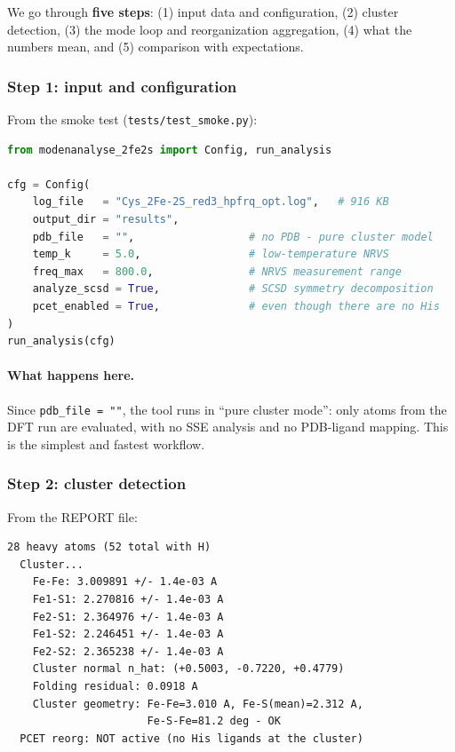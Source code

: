 \documentclass[11pt,a4paper,twoside]{article}
\theoremstyle{remark}
\begin{document}
We go through \textbf{five steps}: (1) input data and
configuration, (2) cluster detection, (3) the mode loop and
reorganization aggregation, (4) what the numbers mean, and
(5) comparison with expectations.

\subsubsection*{Step 1: input and configuration}

From the smoke test (\texttt{tests/test\_smoke.py}):

\begin{lstlisting}[language=Python,basicstyle=\ttfamily\small]
from modenanalyse_2fe2s import Config, run_analysis

cfg = Config(
    log_file   = "Cys_2Fe-2S_red3_hpfrq_opt.log",   # 916 KB
    output_dir = "results",
    pdb_file   = "",                  # no PDB - pure cluster model
    temp_k     = 5.0,                 # low-temperature NRVS
    freq_max   = 800.0,               # NRVS measurement range
    analyze_scsd = True,              # SCSD symmetry decomposition
    pcet_enabled = True,              # even though there are no His
)
run_analysis(cfg)
\end{lstlisting}

\paragraph{What happens here.}
Since \texttt{pdb\_file = ""}, the tool runs in ``pure cluster
mode'': only atoms from the DFT run are evaluated, with no SSE
analysis and no PDB-ligand mapping. This is the simplest and
fastest workflow.

\subsubsection*{Step 2: cluster detection}

From the REPORT file:
\begin{lstlisting}[basicstyle=\ttfamily\small]
  28 heavy atoms (52 total with H)
  Cluster...
    Fe-Fe: 3.009891 +/- 1.4e-03 A
    Fe1-S1: 2.270816 +/- 1.4e-03 A
    Fe2-S1: 2.364976 +/- 1.4e-03 A
    Fe1-S2: 2.246451 +/- 1.4e-03 A
    Fe2-S2: 2.365238 +/- 1.4e-03 A
    Cluster normal n_hat: (+0.5003, -0.7220, +0.4779)
    Folding residual: 0.0918 A
    Cluster geometry: Fe-Fe=3.010 A, Fe-S(mean)=2.312 A,
                      Fe-S-Fe=81.2 deg - OK
  PCET reorg: NOT active (no His ligands at the cluster)
\end{lstlisting}
\end{document}
